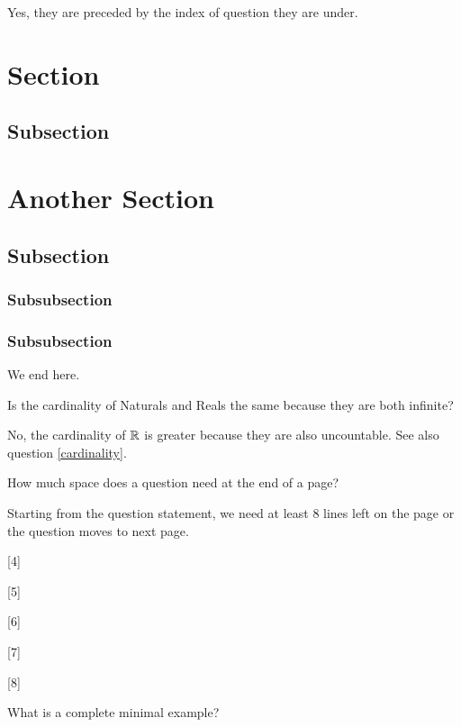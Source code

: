 \documentclass{homework}
\begin{document}
\begin{sol}
  Yes, they are preceded by the index of question they are under.

  \section{Section}
  \subsection{Subsection}
  \section{Another Section}
  \subsection{Subsection}
  \subsubsection{Subsubsection}
  \subsubsection{Subsubsection} We end here.
\end{sol}

\question[IX]\label{custom-index} Is the cardinality of Naturals and
Reals the same because they are both infinite?

\begin{sol}
  No, the cardinality of $\mathbb{R}$ is greater because they are also
  uncountable. See also question \ref{cardinality}.
\end{sol}

\question How much space does a question need at the end of a page?

\begin{sol}
  Starting from the question statement, we need at least 8 lines left
  on the page or the question moves to next page.

    [4]

    [5]

    [6]

    [7]

    [8]
\end{sol}

\question What is a complete minimal example?
\end{document}

